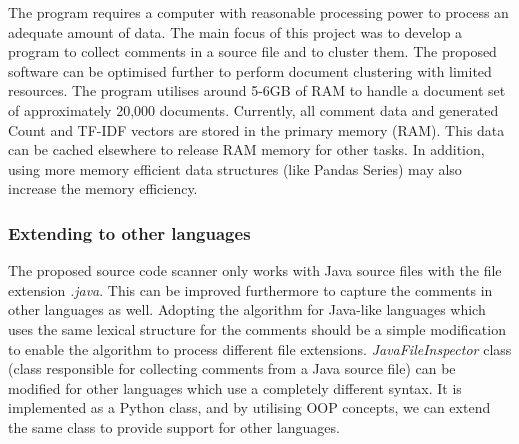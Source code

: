 \documentclass[conference]{IEEEtran}
\begin{document}
The program requires a computer with reasonable processing power to process an adequate amount of data. The main focus of this project was to develop a program to collect comments in a source file and to cluster them. The proposed software can be optimised further to perform document clustering with limited resources.  The program utilises around 5-6GB of RAM to handle a document set of approximately 20,000 documents. Currently, all comment data and generated Count and TF-IDF vectors are stored in the primary memory (RAM). This data can be cached elsewhere to release RAM memory for other tasks. In addition, using more memory efficient data structures (like Pandas Series) may also increase the memory efficiency.

\subsubsection{Extending to other languages} 

The proposed source code scanner only works with Java source files with the file extension \textit{.java}. This can be improved furthermore to capture the comments in other languages as well. Adopting the algorithm for Java-like languages which uses the same lexical structure for the comments should be a simple modification to enable the algorithm to process different file extensions. \textit{JavaFileInspector} class (class responsible for collecting comments from a Java source file) can be modified for other languages which use a completely different syntax. It is implemented as a Python class, and by utilising OOP concepts, we can extend the same class to provide support for other languages. 



\end{document}
